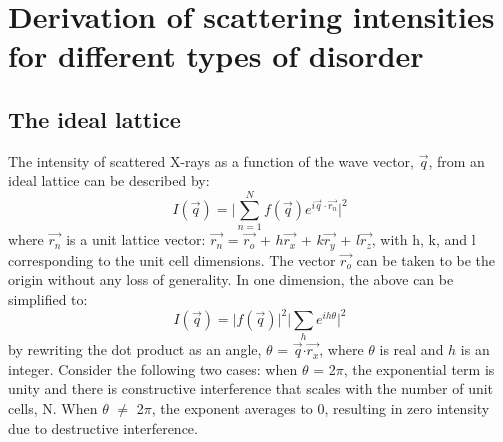 \documentclass{article}
\begin{document}
\section{Derivation of scattering intensities for different types of disorder}
\subsection{The ideal lattice} 
The intensity of scattered X-rays as a function of the wave vector, $\vec{q}$, from an ideal lattice can be described by: 
\begin{equation}
I(\vec{q}) = \vert \sum\limits_{n=1}^N f(\vec{q})e^{i\vec{q}\cdot\vec{r_n}}\vert^2
\end{equation}
where $\vec{r_n}$ is a unit lattice vector: $\vec{r_n}$ = $\vec{r_o}$ + $h$$\vec{r_x}$ + $k$$\vec{r_y}$ + $l$$\vec{r_z}$, with h, k, and l corresponding to the unit cell dimensions. The vector $\vec{r_o}$ can be taken to be the origin without any loss of generality. In one dimension, the above can be simplified to:
\begin{equation}
I(\vec{q}) = \vert f(\vec{q}) \vert^2   \vert \sum\limits_{h} e^{ih\theta}\vert^2
\end{equation}
by rewriting the dot product as an angle, $\theta$ = $\vec{q}$$\cdot$$\vec{r_x}$, where $\theta$ is real and $h$ is an integer. Consider the following two cases: when $\theta$ = 2$\pi$, the exponential term is unity and there is constructive interference that scales with the number of unit cells, N. When $\theta$ $\neq$ 2$\pi$, the exponent averages to 0, resulting in zero intensity due to destructive interference.
\end{document}
